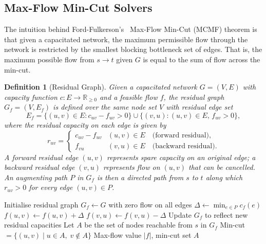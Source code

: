 \documentclass[12pt]{report}
\newtheorem{definition}{Definition}
\begin{document}
\subsection{Max-Flow Min-Cut Solvers}

The intuition behind Ford-Fulkerson's~\cite{ford1956,ford1962} Max-Flow Min-Cut (MCMF) theorem is that given a capacitated network, the maximum permissible flow through the network is restricted by the smallest blocking bottleneck set of edges. That is, the maximum possible flow from $s \to t$ given $G$ is equal to the sum of flow across the min-cut.


\begin{definition}[Residual Graph]
Given a capacitated network $G=(V,E)$ with capacity function 
$c:E\to\mathbb{R}_{\ge 0}$ and a feasible flow $f$, the residual 
graph $G_f=(V,E_f)$ is defined over the same node set $V$ with 
residual edge set
\[
E_f = \{(u,v)\in E : c_{uv} - f_{uv} > 0\} 
      \cup \{(v,u) : (u,v)\in E,\, f_{uv} > 0\},
\]
where the residual capacity on each edge is given by
\[
r_{uv} = \begin{cases} c_{uv} - f_{uv} & (u,v)\in E 
\quad \text{(forward residual)},\\ 
f_{vu} & (v,u)\in E \quad \text{(backward residual).}\end{cases}
\]
A forward residual edge $(u,v)$ represents spare capacity on an original edge; a backward residual edge $(v,u)$ represents flow on $(u,v)$ that can be cancelled.
An augmenting path $P$ in $G_f$ is then a directed path from 
$s$ to $t$ along which $r_{uv}>0$ for every edge $(u,v)\in P$.
\end{definition}

\begin{algorithm}[h]
\caption{Ford-Fulkerson Min-Cut Max-Flow}
\label{alg:ff-minmax}
\begin{algorithmic}[1]
\STATE Initialise residual graph $G_f \gets G$ with zero flow on all edges
    \STATE $\Delta \gets \min_{e \in P} c_f(e)$ 
        \STATE $f(u,v) \gets f(u,v) + \Delta$ 
        \STATE $f(v,u) \gets f(v,u) - \Delta$ 
    \ENDFOR
    \STATE Update $G_f$ to reflect new residual capacities
\ENDWHILE
\STATE Let $A$ be the set of nodes reachable from $s$ in $G_f$
\STATE Min-cut $= \{(u,v) \mid u \in A,\; v \notin A\}$
\RETURN Max-flow value $|f|$, min-cut set $A$
\end{algorithmic}
\end{algorithm}
\end{document}
